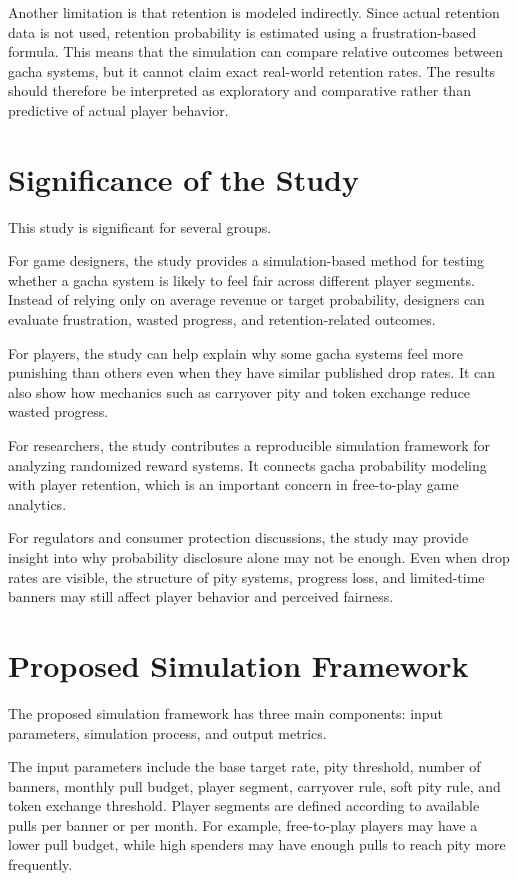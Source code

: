 \documentclass[sigconf,nonacm]{acmart}
\begin{document}
Another limitation is that retention is modeled indirectly. Since actual retention data is not used, retention probability is estimated using a frustration-based formula. This means that the simulation can compare relative outcomes between gacha systems, but it cannot claim exact real-world retention rates. The results should therefore be interpreted as exploratory and comparative rather than predictive of actual player behavior.

\section{Significance of the Study}

This study is significant for several groups.

For game designers, the study provides a simulation-based method for testing whether a gacha system is likely to feel fair across different player segments. Instead of relying only on average revenue or target probability, designers can evaluate frustration, wasted progress, and retention-related outcomes.

For players, the study can help explain why some gacha systems feel more punishing than others even when they have similar published drop rates. It can also show how mechanics such as carryover pity and token exchange reduce wasted progress.

For researchers, the study contributes a reproducible simulation framework for analyzing randomized reward systems. It connects gacha probability modeling with player retention, which is an important concern in free-to-play game analytics.

For regulators and consumer protection discussions, the study may provide insight into why probability disclosure alone may not be enough. Even when drop rates are visible, the structure of pity systems, progress loss, and limited-time banners may still affect player behavior and perceived fairness.

\section{Proposed Simulation Framework}

The proposed simulation framework has three main components: input parameters, simulation process, and output metrics.

The input parameters include the base target rate, pity threshold, number of banners, monthly pull budget, player segment, carryover rule, soft pity rule, and token exchange threshold. Player segments are defined according to available pulls per banner or per month. For example, free-to-play players may have a lower pull budget, while high spenders may have enough pulls to reach pity more frequently.
\end{document}
